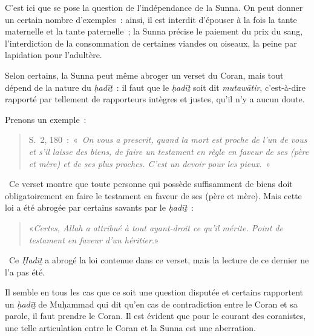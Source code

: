 
C'est ici que se pose la question de l'indépendance de la Sunna. On peut
donner un certain nombre d'exemples~: ainsi, il est interdit d'épouser à
la fois la tante maternelle et la tante paternelle~; la Sunna précise le
paiement du prix du sang, l'interdiction de la consommation de certaines
viandes ou oiseaux, la peine par lapidation pour l'adultère.


Selon certains, la Sunna peut même abroger un verset du Coran, mais tout
dépend de la nature du \emph{ḥadīṯ}~: il faut que le \emph{ḥadīṯ} soit
dit \emph{mutawātir}, c'est-à-dire rapporté par tellement de rapporteurs
intègres et justes, qu'il n'y a aucun doute.

Prenons un exemple~: 
\begin{quote}
  S.~2, 180~:~«~\emph{On vous a prescrit, quand la
mort est proche de l'un de vous et s'il laisse des biens, de faire un
testament en règle en faveur de ses (père et mère) et de ses plus
proches. C'est un devoir pour les pieux.}~»  
\end{quote}


~Ce verset montre que toute personne qui possède suffisamment de biens
doit obligatoirement en faire le testament en faveur de ses (père et
mère). Mais cette loi a été abrogée par certains savants par le
\emph{ḥadīṯ}~: 
\begin{quote}
    «\emph{Certes, Allah a attribué à tout ayant-droit ce
qu'il mérite. Point de testament en faveur d'un héritier}.»
\end{quote}


~Ce \emph{Ḥadīṯ} a abrogé la loi contenue dans ce verset, mais la
lecture de ce dernier ne l'a pas été.

Il semble en tous les cas que ce soit une question disputée et certains
rapportent un \emph{ḥadīṯ} de Muḥammad qui dit qu'en cas de
contradiction entre le Coran et sa parole, il faut prendre le Coran. Il
est évident que pour le courant des coranistes, une telle articulation
entre le Coran et la Sunna est une aberration.

